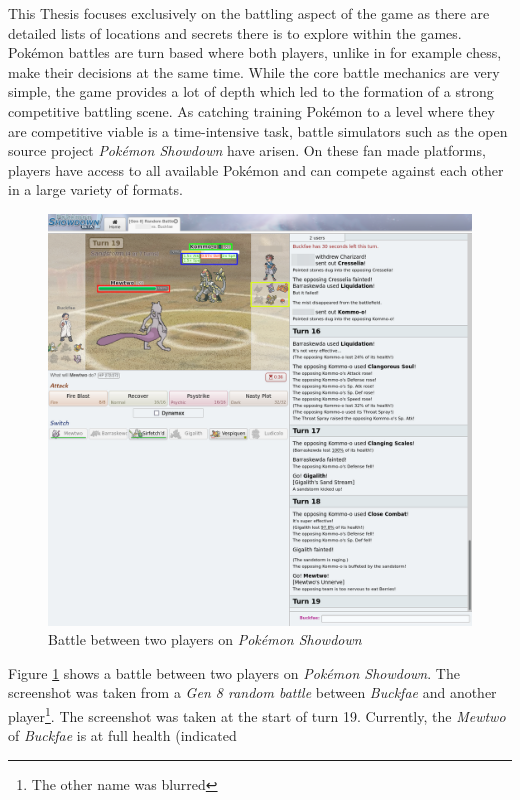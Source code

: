 This Thesis focuses exclusively on the battling aspect of the game as there are detailed lists of locations and
secrets there is to explore within the games. Pokémon battles are turn based where both players, unlike in 
for example chess, make their decisions at the same time. While the core battle mechanics are very simple, 
the game provides a lot of depth which led to the formation of a strong competitive battling scene.
As catching training Pokémon to a level where they are competitive viable is a time-intensive task, battle
simulators such as the open source project \textit{Pokémon Showdown}  have arisen. On these fan made
platforms, players have access to all available Pokémon and can compete against each other in a large variety
of formats.
\begin{figure}
  \centering
  \includegraphics[width=1\textwidth]{images/Showdown.png}
  \caption{Battle between two players on \textit{Pokémon Showdown}}
  \label{fig:showdown-battle}
\end{figure}
Figure \ref{fig:showdown-battle}  shows a battle between two players on 
\textit{Pokémon Showdown}. The screenshot was taken from a \textit{Gen 8 random battle} between 
\textit{Buckfae} and another player\footnote{The other name was blurred}. The screenshot was taken
at the start of turn 19. Currently, the \textit{Mewtwo} of \textit{Buckfae} is at full health (indicated
